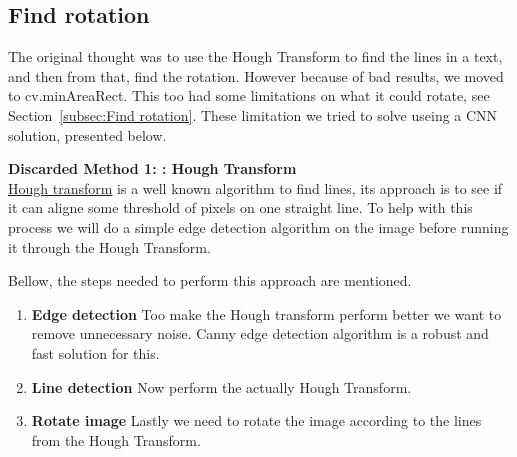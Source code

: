 \documentclass[Report.tex]{subfiles}
\begin{document}
\subsection{Find rotation}
\label{Discard:rotation}
The original thought was to use the Hough Transform to find the lines in a text, and then from that, find the rotation. However because of bad results, we moved to cv.minAreaRect. This too had some limitations on what it could rotate, see Section~\ref{subsec:Find rotation}. These limitation we tried to solve useing a CNN solution, presented below.

\begin{flushleft}
  \textbf{Discarded Method 1: : Hough Transform} \\
  \href{https://en.wikipedia.org/wiki/Hough_transform}{Hough transform} is a well known algorithm to find lines, its approach is to see if it can aligne some threshold of pixels on one straight line. To help with this process we will do a simple edge detection algorithm on the image before running it through the Hough Transform. \par Bellow, the steps needed to perform this approach are mentioned.

  \begin{enumerate}
    \item \textbf{Edge detection}
    Too make the Hough transform perform better we want to remove unnecessary noise. Canny edge detection algorithm is a robust and fast solution for this.
    \item \textbf{Line detection}
    Now perform the actually Hough Transform.
    \item \textbf{Rotate image}
    Lastly we need to rotate the image according to the lines from the Hough Transform.
  \end{enumerate}
\end{flushleft}
\end{document}
